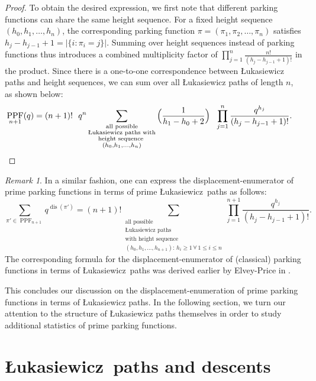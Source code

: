 \documentclass[12pt,reqno]{amsart}
\theoremstyle{definition}
\theoremstyle{remark}
\newtheorem{remark}{Remark}
\DeclareMathOperator{\PPF}{PPF}
\DeclareMathOperator{\disp}{dis} %
\newcommand{\Luka}{\L ukasiewicz}
\begin{document}
\begin{proof}
To obtain the desired expression, we first note that different parking functions can share the same height sequence.  For a fixed height sequence \( (h_0, h_1, \ldots, h_n) \), the corresponding parking function $\pi=(\pi_1,\pi_2, \dots, \pi_n)$ satisfies $h_{j}-h_{j-1}+ 1= |\{ i: \pi_{i}=j\}|$. Summing over height sequences instead of parking functions thus introduces a combined multiplicity factor of $\prod_{j=1}^n \frac{n! }{(h_{j}-h_{j-1}+1)!}$ in the product. Since there is a one-to-one correspondence between \L{}ukasiewicz paths and height sequences, we can sum over all \L{}ukasiewicz paths of length \( n \), as shown below:
\begin{align*}
\PPF_{n+1}(q)
&= (n+1)! ~~q^n \sum_{\substack{\text{all possible}\\\text{\Luka~paths with} \\ \text{height sequence } \\
(h_0, h_1, \dots, h_n)}} \Big( \frac{1}{h_1-h_0+2}  \Big) ~~ \prod_{j=1}^{n} \frac{q^{h_{j}}}{(h_{j}-h_{j-1}+1)!}.  \qedhere
\end{align*}
\end{proof}



\begin{remark}
    In a similar fashion, one can express the displacement-enumerator of prime parking functions  in terms of  prime \Luka~paths as follows: 
\begin{equation*}
\sum_{\pi' \in \PPF_{n+1}} q^{\disp(\pi')} =(n+1)! \sum_{
\substack{
\text{all possible}
\\
\text{\Luka~paths} 
\\
\text{with height sequence} 
\\
(h_0, h_1, \dots, h_{n+1}): \, h_i \geq 1 \, \forall\, 1\leq i\leq n}} \prod_{j=1}^{n+1} \frac{q^{h_{j}}}{(h_{j}-h_{j-1}+1)!}.
\end{equation*}
The corresponding formula for the displacement-enumerator of (classical) parking functions  in terms of \Luka~paths was derived earlier by Elvey-Price in \cite[Lemma 2.3]{Elvey}.
\end{remark}

This concludes our discussion on the displacement-enumeration of prime parking functions in terms of \L{}ukasiewicz paths. In the following section, we turn our attention to the structure of \L{}ukasiewicz paths themselves in order to study additional statistics of prime parking functions.


\section{\Luka~paths and descents}\label{sec:L paths}
\end{document}

